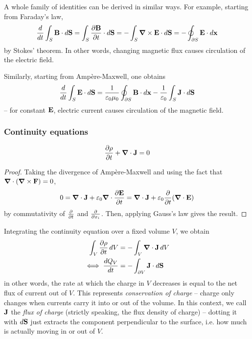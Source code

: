 \documentclass{../template/note}
\begin{document}
    \begin{remark*}
        A whole family of identities can be derived in similar ways. For example, starting from Faraday's law,
        \begin{align*}
            \frac{d}{dt} \int_S \V B \cdot d\V S = \int_S \pd{\V B}t \cdot d\V S = -\int_S \curl \V E \cdot d\V S = -\oint_{\pr S} \V E \cdot d\V x
        \end{align*}
        by Stokes' theorem. In other words, changing magnetic flux causes circulation of the electric field.

        Similarly, starting from Amp\`ere-Maxwell, one obtains
        \begin{align*}
            \frac{d}{dt} \int_S \V E \cdot d\V S = \frac 1{\eps_0\mu_0} \oint_{\pr S} \V B \cdot d\V x - \frac 1{\eps_0} \int_S \V J \cdot d \V S
        \end{align*}
        -- for constant \(\V E\), electric current causes circulation of the magnetic field.
    \end{remark*}
    
    \subsubsection{Continuity equations}

    \begin{proposition}
        \[
            \pd \rho t + \div \V J = 0
        \]
    \end{proposition}
    
    \begin{proof}
        Taking the divergence of Amp\`ere-Maxwell and using the fact that \(\div (\curl \V F) = 0\),
        \begin{align*}
            0 = \div \V J + \eps_0 \div \pd{\V E}{t} = \div \V J + \eps_0 \pd{}{t}(\div \V E)
        \end{align*}
        by commutativity of \(\pd{}{t}\) and \(\pd{}{x_i}\). Then, applying Gauss's law gives the result.
    \end{proof}
    
    Integrating the continuity equation over a fixed volume \(V\), we obtain
    \begin{align*}
        \int_V \pd \rho t \D V &= -\int_V \div \V J \D V \\
        \iff \frac{dQ_V}{dt} &= -\int_{\pr V} \V J \cdot d\V S
    \end{align*}
    in other words, the rate at which the charge in \(V\) decreases is equal to the net flux of current out of \(V\). This represents \emph{conservation of charge} -- charge only changes when currents carry it into or out of the volume. In this context, we call \(\V J\) the \emph{flux of charge} (strictly speaking, the flux density of charge) -- dotting it with \(d \V S\) just extracts the component perpendicular to the surface, i.e. how much is actually moving in or out of \(V\).
\end{document}
